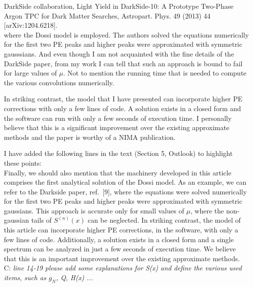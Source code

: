 \documentclass[a4paper,11pt]{article}
\begin{document}
DarkSide collaboration, Light Yield in DarkSide-10: A Prototype Two-Phase Argon TPC for Dark Matter Searches, Astropart. Phys. 49 (2013) 44 [arXiv:1204.6218].
\\[1ex]

\noindent where the Dossi model is employed. 
The authors solved the equations numerically for the first two PE peaks and higher peaks were approximated with symmetric gausssians. 
And even though I am not acquainted with the fine details of the DarkSide paper, from my work I can tell that such an approach is bound to fail
for large values of $\mu$. Not to mention the running time that is needed to compute the various convolutions numerically.  

In striking contrast, the model that I have presented can incorporate higher PE corrections with only a few lines of code. 
A solution exists in a closed form and the software can run with only a few seconds of execution time. 
I personally believe that this is a significant improvement over the existing approximate methods and the paper is worthy of a NIMA publication.  

I have added the following lines in the text (Section 5, Outlook) to highlight these points:
\\[1ex]

Finally, we should also mention that the machinery developed in this article comprises the first analytical solution of the Dossi model. 
As an example, we can refer to the Darkside paper, ref.~[9], where the equations were solved numerically for the first two PE peaks 
and higher peaks were approximated with symmetric gaussians. 
This approach is accurate only for small values of $\mu$, where the non-gaussian tails of $S^{(n)}(x)$ can be neglected. 
In striking contrast, the model of this article can incorporate higher PE corrections, in the software, with only a few lines of code. 
Additionally, a solution exists in a closed form and a single spectrum can be analyzed in just a few seconds of execution time. 
We believe that this is an important improvement over the existing approximate methods. 
\\[1ex]

C: \emph{ line 14-19 please add some explanations for S(x) and define the various used items, such as $g_N$, Q, H(x) ... }
\end{document}

